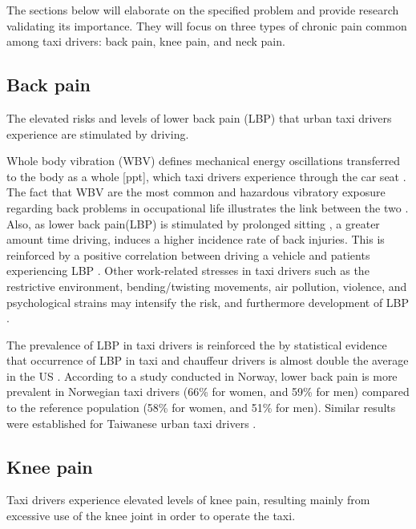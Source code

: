 \documentclass[11pt]{article}
\begin{document}
The sections below will elaborate on the specified problem and provide
research validating its importance. They will focus on three types of
chronic pain common among taxi drivers: back pain, knee pain, and neck
pain. 
\subsection{Back pain}
The elevated risks and levels of lower back pain (LBP) that urban taxi drivers 
experience are stimulated by driving. 

Whole body vibration (WBV) defines mechanical energy oscillations transferred to 
the body as a whole [ppt], which taxi drivers experience \cite{KneePain, Serious} 
through the car seat \cite{ppt}. The fact that WBV are the most common and hazardous 
vibratory exposure regarding back problems in occupational life illustrates the
link between the two \cite{ODrivers@Risk}. Also, as lower back pain(LBP) is stimulated by 
prolonged sitting \cite{Okunribido2008}, a greater amount time driving, induces a 
higher incidence rate of back injuries\cite{Question?}. This is reinforced by a positive 
correlation between driving a vehicle and patients experiencing LBP \cite{ODrivers@Risk}. 
Other work-related stresses in taxi drivers such as the restrictive environment, bending/twisting 
movements, air pollution, violence, and psychological strains may intensify the risk, 
and furthermore development of LBP \cite{KneePain, POSTULATED}. 

The prevalence of LBP in taxi drivers is reinforced the by statistical evidence that occurrence of LBP 
in taxi and chauffeur drivers is almost double the average in the US \cite{68}. According to a study conducted in Norway, lower 
back pain is more prevalent in Norwegian taxi drivers (66\% for women, and 59\% for men) 
compared to the reference population (58\% for women, and 51\% for men). Similar results 
were established for Taiwanese urban taxi drivers \cite{Question?}.

 
\subsection{Knee pain}
Taxi drivers experience elevated levels of knee pain, resulting mainly from excessive use 
of the knee joint in order to operate the taxi. 
\end{document}

